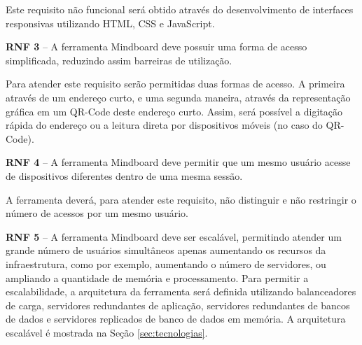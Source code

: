 Este requisito não funcional será obtido através do desenvolvimento de interfaces responsivas utilizando HTML, CSS e JavaScript.

\textbf{RNF 3} – A ferramenta Mindboard deve possuir uma forma de acesso simplificada, reduzindo assim barreiras de utilização. 

Para atender este requisito serão permitidas duas formas de acesso. A primeira através de um endereço curto, e uma segunda maneira, através da representação gráfica em um QR-Code deste endereço curto. Assim, será possível a digitação rápida do endereço ou a leitura direta por dispositivos móveis (no caso do QR-Code).

\textbf{RNF 4} – A ferramenta Mindboard deve permitir que um mesmo usuário acesse de dispositivos diferentes dentro de uma mesma sessão. 

A ferramenta deverá, para atender este requisito, não distinguir e não restringir o número de acessos por um mesmo usuário.

\textbf{RNF 5} – A ferramenta Mindboard deve ser escalável, permitindo atender um grande número de usuários simultâneos apenas aumentando os recursos da infraestrutura, como por exemplo, aumentando o número de servidores, ou ampliando a quantidade de memória e processamento.  Para permitir a escalabilidade, a arquitetura da ferramenta será definida utilizando balanceadores de carga, servidores redundantes de aplicação, servidores redundantes de bancos de dados e servidores replicados de banco de dados em memória. A arquitetura escalável é mostrada na Seção \ref{sec:tecnologias}.